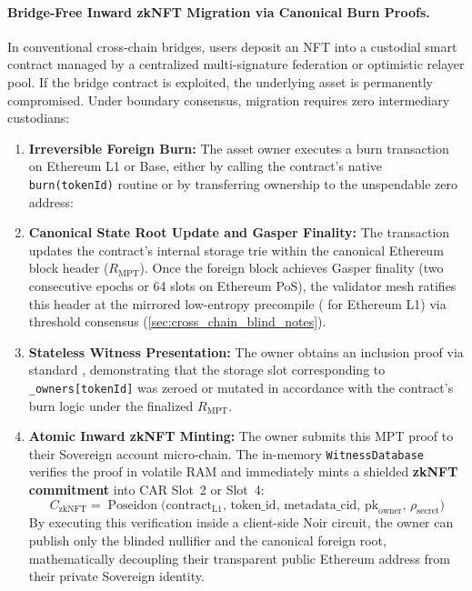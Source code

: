 \documentclass[a4paper,11pt,twoside,parskip=half-,headings=small]{scrartcl}
\newcommand{\code}[1]{\texttt{#1}}
\begin{document}
\paragraph{Bridge-Free Inward zkNFT Migration via Canonical Burn Proofs.}
In conventional cross-chain bridges, users deposit an NFT into a custodial smart contract managed by a centralized multi-signature federation or optimistic relayer pool. If the bridge contract is exploited, the underlying asset is permanently compromised. Under boundary consensus, migration requires zero intermediary custodians:
\begin{enumerate}[nosep]
  \item \textbf{Irreversible Foreign Burn:} The asset owner executes a burn transaction on Ethereum L1 or Base, either by calling the contract's native \code{burn(tokenId)} routine or by transferring ownership to the unspendable zero address:
  \begin{center}
  \end{center}
  \item \textbf{Canonical State Root Update and Gasper Finality:} The transaction updates the contract's internal storage trie within the canonical Ethereum block header ($R_{\text{MPT}}$). Once the foreign block achieves Gasper finality (two consecutive epochs or 64 slots on Ethereum PoS), the validator mesh ratifies this header at the mirrored low-entropy precompile ( for Ethereum L1) via threshold consensus (\cref{sec:cross_chain_blind_notes}).
  \item \textbf{Stateless Witness Presentation:} The owner obtains an inclusion proof via standard , demonstrating that the storage slot corresponding to \code{\_owners[tokenId]} was zeroed or mutated in accordance with the contract's burn logic under the finalized $R_{\text{MPT}}$.
  \item \textbf{Atomic Inward zkNFT Minting:} The owner submits this MPT proof to their Sovereign account micro-chain. The in-memory \code{WitnessDatabase} verifies the proof in volatile RAM and immediately mints a shielded \textbf{zkNFT commitment} into CAR Slot~2 or Slot~4:
  \begin{equation}
    C_{\text{zkNFT}} = \operatorname{Poseidon}\bigl(\text{contract}_{\text{L1}},\, \text{token\_id},\, \text{metadata\_cid},\, \text{pk}_{\text{owner}},\, \rho_{\text{secret}}\bigr)
    \label{eq:zknft_cross_mint}
  \end{equation}
  By executing this verification inside a client-side Noir circuit, the owner can publish only the blinded nullifier and the canonical foreign root, mathematically decoupling their transparent public Ethereum address from their private Sovereign identity.
\end{enumerate}
\end{document}

